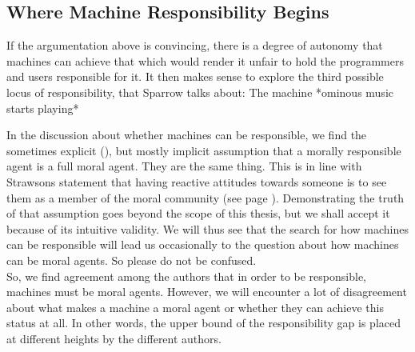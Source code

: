 \documentclass{article}
\begin{document}





\subsection{Where Machine Responsibility Begins}

If the argumentation above is convincing, there is a degree of autonomy that
machines can achieve that which would render it unfair to hold the programmers and users
responsible for it. It then makes sense to explore the third possible locus of
responsibility, that Sparrow talks about: The machine *ominous music starts
playing*

In the discussion about whether machines can be responsible, we find the
sometimes explicit (\cite[p.  489]{SmithVickers2021}), but mostly implicit
assumption that a morally responsible agent is a full moral agent. They are
the same thing. This is in line with Strawsons statement that having reactive
attitudes towards someone is to see them as a member of the moral community
(see page \pageref{responsibility_implies_agency}). Demonstrating the truth of
that assumption goes beyond the scope of this thesis, but we shall accept it
because of its intuitive validity. We will thus see that the search for how
machines can be responsible will lead us occasionally to the question about
how machines can be moral agents. So please do not be confused.\\
So, we find agreement among the authors that in order to be responsible,
machines must be moral agents. However, we will encounter a lot of disagreement
about what makes a machine a moral agent or whether they can achieve this status
at all. In other words, the upper bound of the responsibility gap is placed at
different heights by the different authors.
\end{document}
